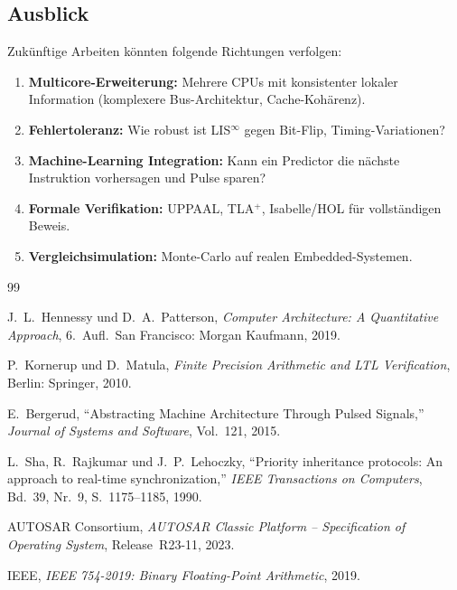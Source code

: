 \documentclass[a4paper,12pt]{article}
\theoremstyle{definition}
\begin{document}
\subsection{Ausblick}

Zukünftige Arbeiten könnten folgende Richtungen verfolgen:

\begin{enumerate}
	\item \textbf{Multicore-Erweiterung:} Mehrere CPUs mit konsistenter lokaler Information (komplexere Bus-Architektur, Cache-Kohärenz).
	
	\item \textbf{Fehlertoleranz:} Wie robust ist LIS$^{\infty}$ gegen Bit-Flip, Timing-Variationen?
	
	\item \textbf{Machine-Learning Integration:} Kann ein Predictor die nächste Instruktion vorhersagen und Pulse sparen?
	
	\item \textbf{Formale Verifikation:} UPPAAL, TLA$^+$, Isabelle/HOL für vollständigen Beweis.
	
	\item \textbf{Vergleichsimulation:} Monte-Carlo auf realen Embedded-Systemen.
\end{enumerate}

\begin{thebibliography}{99}
	
	J.~L.\ Hennessy und D.~A.\ Patterson,
	\textit{Computer Architecture: A Quantitative Approach},
	6.~Aufl.\ San Francisco: Morgan Kaufmann, 2019.
	
	P.~Kornerup und D.~Matula,
	\textit{Finite Precision Arithmetic and LTL Verification},
	Berlin: Springer, 2010.
	
	E.~Bergerud,
	``Abstracting Machine Architecture Through Pulsed Signals,''
	\textit{Journal of Systems and Software}, Vol.~121, 2015.
	
	L.~Sha, R.~Rajkumar und J.~P.~Lehoczky,
	``Priority inheritance protocols: An approach to real-time synchronization,''
	\textit{IEEE Transactions on Computers}, Bd.~39, Nr.~9, S.~1175--1185, 1990.
	
	AUTOSAR Consortium,
	\textit{AUTOSAR Classic Platform -- Specification of Operating System},
	Release~R23-11, 2023.
	
	IEEE,
	\textit{IEEE 754-2019: Binary Floating-Point Arithmetic},
	2019.
	
\end{thebibliography}
	
\end{document}
